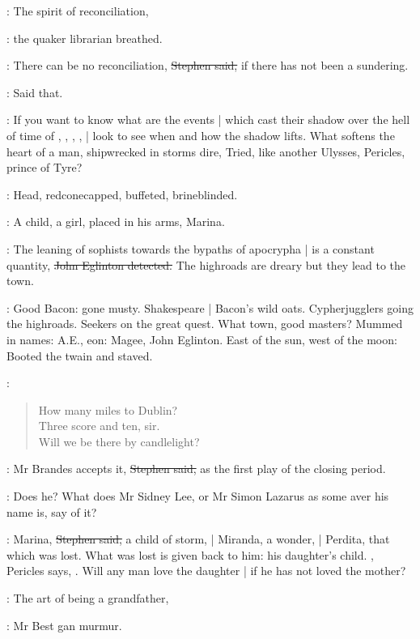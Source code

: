 \librarian:
The spirit of reconciliation,

:
the quaker librarian breathed.

\Stephen:
There can be no reconciliation,
\sout{Stephen said,}
if there has not been a sundering.

\StephenInt:
Said that.

\Stephen:
If you want to know what are the events |
which cast their shadow over the hell of time of
,
,
,
, |
look to see when and how the shadow lifts.
What softens the heart of a man,
shipwrecked in storms dire,
Tried,
like another Ulysses,
Pericles, prince of Tyre?

\StephenInt:
Head,
redconecapped,
buffeted,
brineblinded.

\Stephen:
A child, a girl,
placed in his arms,
Marina.

\eglinton:
The leaning of sophists towards the bypaths of apocrypha |
is a constant quantity,
\sout{John Eglinton detected.}
The highroads are dreary but they lead to the town.

\StephenInt:
Good Bacon:
gone musty.
Shakespeare |
Bacon's wild oats.
Cypherjugglers going the highroads.
Seekers on the great quest.
What town,
good masters?
Mummed in names:
A.E.,
eon:
Magee,
John Eglinton.
East of the sun,
west of the moon:
Booted the twain and staved.

\StephenInt:
\begin{verse}
    How many miles to Dublin? \\
    Three score and ten, sir. \\
    Will we be there by candlelight?
\end{verse}

\Stephen:
Mr Brandes accepts it,
\sout{Stephen said,}
as the first play of the closing period.

\eglinton:
Does he?
What does Mr Sidney Lee,
or Mr Simon Lazarus as some aver his name is,
say of it?

\Stephen:
Marina,
\sout{Stephen said,}
a child of storm, |
Miranda, a wonder, |
Perdita, that which was lost.
What was lost is given back to him:
his daughter's child.
,
Pericles says,
.
Will any man love the daughter |
if he has not loved the mother?

\best:
The art of being a grandfather,

:
Mr Best gan murmur.

